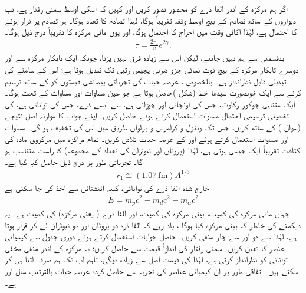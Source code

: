 اگر ہم مرکزہ کے اندر الفا ذرے  کو محصور تصور کریں اور کہیں کہ اسکی اوسط سمتی رفتار  ہے،  تب دیواروں کے ساتھ تصادم کے بیچ اوسط وقفہ تقریباً  ہوگا،  لہٰذا تصادم کا تعدد  ہوگا۔ ہر تصادم پر فرار ہونے کا احتمال  ہے،  لہٰذا اکائی وقت میں اخراج کا احتمال  ہوگا،  اور یوں مائی  مرکزہ کا   تقریباً درج ذیل ہوگا۔
\begin{align}\label{مساوات_وقب_عرصہ_حیات}
	\tau=\frac{2r_{1}}{v} e^{2\gamma}.
\end{align}
بدقسمتی سے ہم  نہیں جانتے، لیکن اس سے زیادہ فرق نہیں پڑتا،  چونکہ ایک تابکار مرکزہ سے اور دوسرے تابکار مرکزہ کے بیچ قوت  نمائی جزو ضربی پچیس رتبی  تک تبدیل ہوتا ہے؛ اس کے سامنے  کی تبدیلی قابل نظرانداز ہے۔ بالخصوص ، عرصہ حیات کی تجرباتی پیمائشی قیمتوں کو  کے ساتھ ترسیم کرنے سے ایک خوبصورت سیدھا خط  (شکل )حاصل ہوتا ہے جو عین مساوات   اور مساوات   کے تحت ہوگا۔
ایک متناہی چوکور رکاوٹ، جس کی اونچائی  اور چوڑائی  ہے،  سے  ایسے ذرے،  جس کی توانائی  ہے،  کی تخمینی ترسیمی احتمال  مساوات   استعمال کرتے ہوئے حاصل کریں۔ اپنے جواب کا موازنہ  اصل  نتیجے  (سوال )  کے ساتھ کریں، جس تک  ونٹزل و کرامرس و برلوان  طریق   میں اس کی تخفیف ہو گی۔
مساوات   اور مساوات   استعمال کرتے ہوئے  اور  کے عرصہ حیات تلاش کریں۔ تمام    مراکزہ میں مرکزوی مادہ کی کثافت تقریباً  ایک جیسی  ہوتی ہے،  لہٰذا    (پروٹان اور نیوٹران کی تعداد کے مجموعہ)    کا راست متناسب ہو گا۔ تجرباتی طور پر درج ذیل حاصل کیا گیا ہے۔
\begin{align}
	r_{1}\cong(\SI{1.07}{\femto\meter})A^{1/3}
\end{align}
خارج شدہ الفا ذرے کی توانائی،  کلیہ آئنشٹائن  سے اخذ کی جا سکتی ہے
\begin{align}
	E=m_{p}c^{2}-m_{d}c^{2}-m_{\alpha}c^{2}
\end{align}
جہاں  مائی مرکزہ کی کمیت،   بیٹی مرکزہ کی کمیت،  اور  الفا ذرے ( یعنی  مرکزہ)  کی کمیت ہے۔ یہ دیکھنے کی خاطر کہ بیٹی مرکزہ کیا ہوگا ، یاد رہے  کہ الفا ذرہ دو پروٹان اور دو نیوٹران لے کر فرار ہوتا ہے،  لہٰذا  سے دو  اور  سے چار منفی کریں۔ حاصل جوابات استعمال کرتے ہوئے دوری جدول سے کیمیائی عنصر کا  تعین کریں۔ سمتی رفتار  کی اندازاً قیمت  سے حاصل کریں؛  یہ مرکزہ کے اندر منفی مخفی توانائی کو نظرانداز کرتی ہے،  لہٰذا  کی قیمت اصل سے زیادہ دیگی،  تاہم اب تک  ہم صرف اتنا ہی کر سکتے ہیں۔ اتفاقی طور پر ان کیمیائی عناصر کی تجربہ سے حاصل کردہ  عرصہ حیات بالترتیب  سال اور   ہے۔


